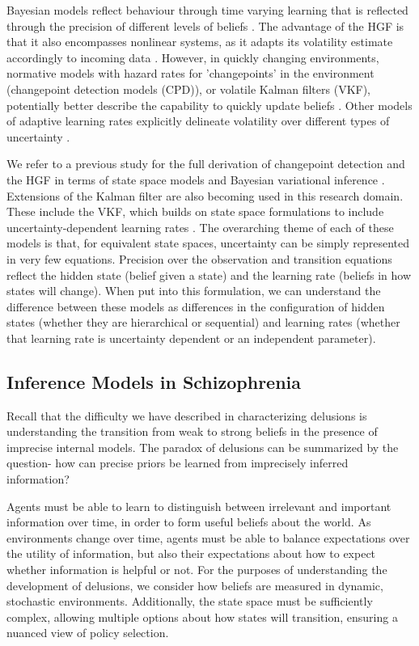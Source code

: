 \documentclass{article}
\begin{document}
Bayesian models reflect behaviour through time varying learning that is reflected through the precision of different levels of beliefs \citep{preuschoff2007adding, mathys2011bayesian}. The advantage of the HGF is that it also encompasses nonlinear systems, as it adapts its volatility estimate accordingly to incoming data \citep{mathys2014uncertainty}. However, in quickly changing environments, normative models with hazard rates for 'changepoints' in the environment (changepoint detection models (CPD)), or volatile Kalman filters (VKF), potentially better describe the capability to quickly update beliefs \citep{nassar2010approximately, piray2020simple}. Other models of adaptive learning rates explicitly delineate volatility over different types of uncertainty \citep{payzan2011risk, yu2005uncertainty}.

We refer to a previous study for the full derivation of changepoint detection and the HGF in terms of state space models and Bayesian variational inference \citep{markovic2016comparative}. Extensions of the Kalman filter are also becoming used in this research domain. These include the VKF, which builds on state space formulations to include uncertainty-dependent learning rates \citep{piray2020simple}. The overarching theme of each of these models is that, for equivalent state spaces, uncertainty can be simply represented in very few equations. Precision over the observation and transition equations reflect the hidden state (belief given a state) and the learning rate (beliefs in how states will change). When put into this formulation, we can understand the difference between these models as differences in the configuration of hidden states (whether they are hierarchical or sequential) and learning rates (whether that learning rate is uncertainty dependent or an independent parameter).

\subsection{Inference Models in Schizophrenia}

Recall that the difficulty we have described in characterizing delusions is understanding the transition from weak to strong beliefs in the presence of imprecise internal models. The paradox of delusions can be summarized by the question- how can precise priors be learned from imprecisely inferred information?

Agents must be able to learn to distinguish between irrelevant and important information over time, in order to form useful beliefs about the world. As environments change over time, agents must be able to balance expectations over the utility of information, but also their expectations about how to expect whether information is helpful or not. For the purposes of understanding the development of delusions, we consider how beliefs are measured in dynamic, stochastic environments. Additionally, the state space must be sufficiently complex, allowing multiple options about how states will transition, ensuring a nuanced view of policy selection.
\end{document}
